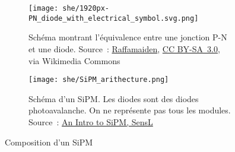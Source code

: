 \begin{figure}
    \centering
    \begin{subfigure}[c]{0.45\textwidth}
        \centering
        \texttt{[image: she/1920px-PN\_diode\_with\_electrical\_symbol.svg.png]}

        \caption{Schéma montrant l'équivalence entre une jonction P-N et une diode. Source~: \href{https://commons.wikimedia.org/wiki/File:PN_diode_with_electrical_symbol.svg}{Raffamaiden}, \href{https://creativecommons.org/licenses/by-sa/3.0}{CC BY-SA~3.0}, via Wikimedia Commons}
        \label{fig_pn_diode}
    \end{subfigure}
    \begin{subfigure}[c]{0.45\textwidth}
        \centering
        \texttt{[image: she/SiPM\_arithecture.png]}

        \caption{Schéma d'un SiPM. Les diodes sont des diodes photoavalanche. On ne représente pas tous les modules. Source~: \href{https://websites.umich.edu/~ners580/ners-bioe_481/lectures/pdfs/2017-02-.pdf}{An Intro to SiPM, SensL}}
        \label{fig_SiPM}
    \end{subfigure}
    \caption[Composition d'un SiPM]{Composition d'un SiPM}
\end{figure}

